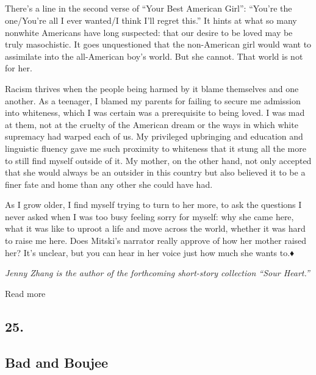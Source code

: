 \hypertarget{-8}{%
\subsection{}\label{-8}}

\hypertarget{-9}{%
\paragraph{}\label{-9}}

There's a line in the second verse of ``Your Best American Girl'':
``You're the one/You're all I ever wanted/I think I'll regret this.'' It
hints at what so many nonwhite Americans have long suspected: that our
desire to be loved may be truly masochistic. It goes unquestioned that
the non-American girl would want to assimilate into the all-American
boy's world. But she cannot. That world is not for her.

Racism thrives when the people being harmed by it blame themselves and
one another. As a teenager, I blamed my parents for failing to secure me
admission into whiteness, which I was certain was a prerequisite to
being loved. I was mad at them, not at the cruelty of the American dream
or the ways in which white supremacy had warped each of us. My
privileged upbringing and education and linguistic fluency gave me such
proximity to whiteness that it stung all the more to still find myself
outside of it. My mother, on the other hand, not only accepted that she
would always be an outsider in this country but also believed it to be a
finer fate and home than any other she could have had.

As I grow older, I find myself trying to turn to her more, to ask the
questions I never asked when I was too busy feeling sorry for myself:
why she came here, what it was like to uproot a life and move across the
world, whether it was hard to raise me here. Does Mitski's narrator
really approve of how her mother raised her? It's unclear, but you can
hear in her voice just how much she wants to.♦

\emph{Jenny Zhang is the author of the forthcoming short-story
collection ``Sour Heart.''}

Read more

\hypertarget{25}{%
\subsection{25.}\label{25}}

\hypertarget{--bad-and-boujee}{%
\subsection{\texorpdfstring{ Bad and
Boujee}{  Bad and Boujee}}\label{--bad-and-boujee}}

